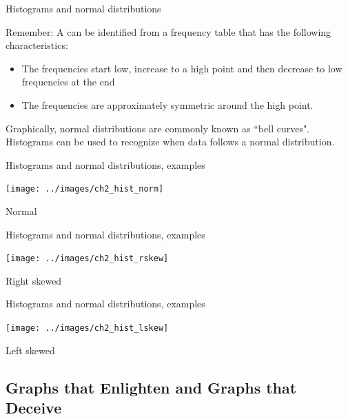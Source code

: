 \documentclass[xcolor=table, handout]{beamer}
\begin{document}
\begin{frame}{Histograms and normal distributions}
\begin{block}{}
Remember: A  can be identified from a frequency table that has the following characteristics:
\begin{itemize}
\item The frequencies start low, increase to a high point and then decrease to low frequencies at the end
\item The frequencies are approximately symmetric around the high point.
\end{itemize}
\end{block}
\pause
\begin{block}{}
Graphically, normal distributions are commonly known as ``bell curves". Histograms can be used to recognize when data follows a normal distribution.
\end{block}
\end{frame}

\begin{frame}{Histograms and normal distributions, examples}

{\centering
\texttt{[image: ../images/ch2\_hist\_norm]}
\par}
\bigskip
\pause
\begin{block}{}
\centering \large Normal
\end{block}
\end{frame}

\begin{frame}{Histograms and normal distributions, examples}

{\centering
\texttt{[image: ../images/ch2\_hist\_rskew]}
\par}
\bigskip
\pause
\begin{block}{}
\centering \large Right skewed
\end{block}
\end{frame}

\begin{frame}{Histograms and normal distributions, examples}

{\centering
\texttt{[image: ../images/ch2\_hist\_lskew]}
\par}
\bigskip
\pause
\begin{block}{}
\centering \large Left skewed
\end{block}
\end{frame}

\subsection{Graphs that Enlighten and Graphs that Deceive}
\end{document}
